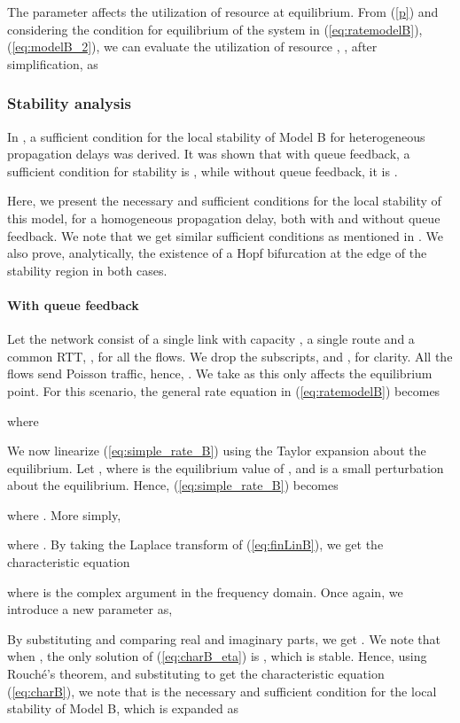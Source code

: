 \documentclass[conference]{IEEEtran}
\begin{document}
The parameter  affects the utilization of resource  at equilibrium. From (\ref{p}) 
and considering the condition for equilibrium of the system in (\ref{eq:ratemodelB}), (\ref{eq:modelB_2}), we can evaluate the utilization of resource , , after simplification, as


\subsubsection{Stability analysis}
In \cite{krv}, a sufficient condition for the local stability of Model B for heterogeneous 
propagation delays was derived. It was shown that with queue feedback, a sufficient condition for stability is , while without queue feedback, it is .

Here, we present the necessary and sufficient conditions for the local stability of this model, for 
a homogeneous propagation delay, both with and without queue feedback. We note 
that we get similar sufficient conditions as mentioned in \cite{krv}. We also prove, analytically, 
the existence of a Hopf bifurcation at the edge of the stability region in both cases.

\paragraph{With queue feedback}

Let the network 
consist of a single link with capacity , a single route and a common RTT, , for all the flows. We drop the subscripts,  and , for clarity. 
All the flows send Poisson traffic, hence, . We take  as this 
only affects the equilibrium point. 
For this scenario, the general rate equation in (\ref{eq:ratemodelB}) becomes


where


We now linearize (\ref{eq:simple_rate_B}) using the Taylor expansion about the 
equilibrium. Let , where  is 
the equilibrium value of , and  is a small perturbation about 
the equilibrium. Hence, (\ref{eq:simple_rate_B}) becomes


where . More simply,

where . By taking the 
Laplace transform of (\ref{eq:finLinB}), we get the characteristic equation


where  is the complex argument in the frequency domain. Once again, we introduce
a new parameter  as,


By substituting  and comparing real and imaginary parts, we get . We note that when , the only 
solution of (\ref{eq:charB_eta}) is , which is stable. Hence, using 
Rouch\'{e}'s theorem, and substituting  to get the characteristic equation (\ref{eq:charB}), we note that  is the necessary and 
sufficient condition for the local stability of Model B, which is expanded as
\end{document}
